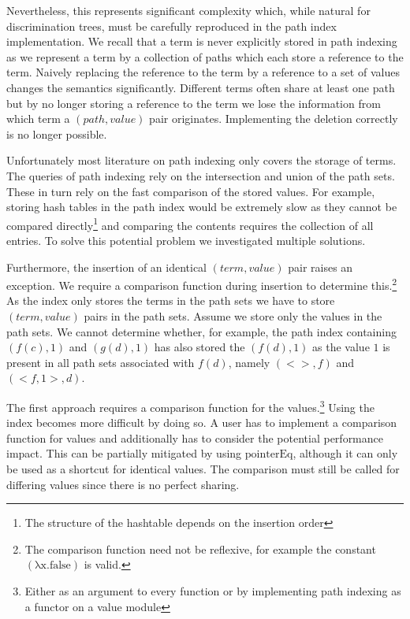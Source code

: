 Nevertheless, this represents significant complexity which, while natural for discrimination trees, must be carefully reproduced in the path index implementation. We recall that a term is never explicitly stored in path indexing as we represent a term by a collection of paths which each store a reference to the term. Naively replacing the reference to the term by a reference to a set of values changes the semantics significantly. Different terms often share at least one path but by no longer storing a reference to the term we lose the information from which term a $(path,value)$ pair originates. Implementing the deletion correctly is no longer possible.

Unfortunately most literature on path indexing only covers the storage of terms. The queries of path indexing rely on the intersection and union of the path sets. These in turn rely on the fast comparison of the stored values. For example, storing hash tables in the path index would be extremely slow as they cannot be compared directly\footnote{The structure of the hashtable depends on the insertion order} and comparing the contents requires the collection of all entries. To solve this potential problem we investigated multiple solutions.

Furthermore, the insertion of an identical $(term,value)$ pair raises an exception. We require a comparison function during insertion to determine this.\footnote{The comparison function need not be reflexive, for example the constant $\mathrm{(\lambda x. false)}$ is valid.} As the index only stores the terms in the path sets we have to store $(term,value)$ pairs in the path sets. Assume we store only the values in the path sets. We cannot determine whether, for example, the path index containing $(f(c),1)$ and $(g(d),1)$ has also stored the $(f(d),1)$ as the value $1$ is present in all path sets associated with $f(d)$, namely $(<>,f)$ and $(<f,1>,d)$.

The first approach requires a comparison function for the values.\footnote{Either as an argument to every function or by implementing path indexing as a functor on a value module} Using the index becomes more difficult by doing so. A user has to implement a comparison function for values and additionally has to consider the potential performance impact. This can be partially mitigated by using $\mathrm{pointerEq}$, although it can only be used as a shortcut for identical values. The comparison must still be called for differing values since there is no perfect sharing.

